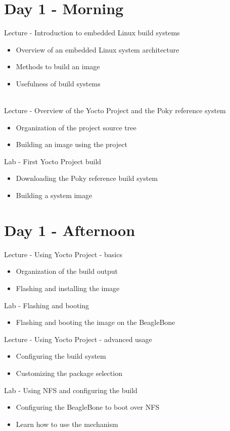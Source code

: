 \documentclass[a4paper,12pt,obeyspaces,spaces,hyphens]{article}
\begin{document}
\section{Day 1 - Morning}

\feagendaonecolumn
{Lecture - Introduction to embedded Linux build systems}
{
  \begin{itemize}
  \item Overview of an embedded Linux system architecture
  \item Methods to build an image
  \item Usefulness of build systems
  \end{itemize}
}
\\
\feagendatwocolumn
{Lecture - Overview of the Yocto Project and the Poky reference system}
{
  \begin{itemize}
  \item Organization of the project source tree
  \item Building an image using the project
  \end{itemize}
}
{Lab - First Yocto Project build}
{
  \begin{itemize}
  \item Downloading the Poky reference build system
  \item Building a system image
 \end{itemize}
}

\section{Day 1 - Afternoon}
\feagendatwocolumn
{Lecture - Using Yocto Project - basics}
{
  \begin{itemize}
  \item Organization of the build output
  \item Flashing and installing the image
  \end{itemize}
}
{Lab - Flashing and booting}
{
  \begin{itemize}
  \item Flashing and booting the image on the BeagleBone
  \end{itemize}
}

\feagendatwocolumn
{Lecture - Using Yocto Project - advanced usage}
{
  \begin{itemize}
  \item Configuring the build system
  \item Customizing the package selection
  \end{itemize}
}
{Lab - Using NFS and configuring the build}
{
  \begin{itemize}
  \item Configuring the BeagleBone to boot over NFS
  \item Learn how to use the  mechanism
  \end{itemize}
}
\\
\end{document}
